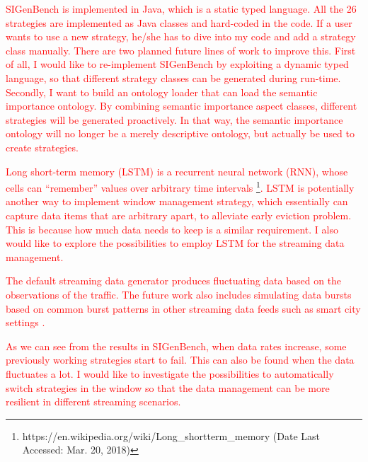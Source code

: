 \textcolor{red}{
SIGenBench is implemented in Java, which is a static typed language.
All the 26 strategies are implemented as Java classes and hard-coded in the code. 
If a user wants to use a new strategy, he/she has to dive into my code and add a strategy class manually. 
There are two planned future lines of work to improve this. 
First of all, I would like to re-implement SIGenBench by exploiting a dynamic typed language, so that different strategy classes can be generated during run-time. 
Secondly, I want to build an ontology loader that can load the semantic importance ontology.
By combining semantic importance aspect classes, different strategies will be generated proactively. 
In that way, the semantic importance ontology will no longer be a merely descriptive ontology, but actually be used to create strategies.
}

\textcolor{red}{
Long short-term memory (LSTM) \cite{DBLP:journals/neco/HochreiterS97} is a recurrent neural network (RNN), whose cells can ``remember'' values over arbitrary time intervals \footnote{https://en.wikipedia.org/wiki/Long\_short\-term\_memory (Date Last Accessed: Mar. 20, 2018)}.
LSTM is potentially another way to implement window management strategy, which essentially can capture data items that are arbitrary apart, to alleviate early eviction problem. 
This is because how much data needs to keep is a similar requirement. 
I also would like to explore the possibilities to employ LSTM for the streaming data management. 
}

\textcolor{red}{
The default streaming data generator produces fluctuating data based on the observations of the traffic. 
The future work also includes simulating data bursts based on common burst patterns in other streaming data feeds such as smart city settings \cite{tonjes2014real}.
}

\textcolor{red}{
As we can see from the results in SIGenBench, when data rates increase, some previously working strategies start to fail.
This can also be found when the data fluctuates a lot.
I would like to investigate the possibilities to automatically switch strategies in the window so that the data management can be more resilient in different streaming scenarios. 
}
%
